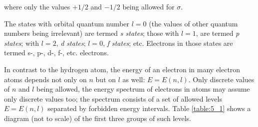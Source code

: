 \noindent
where only the values $+1/2$ and $-1/2$ being allowed for $\sigma$.

The states with orbital quantum number $l=0$ (the values of
other quantum numbers being irrelevant) are termed \textit{s states}; those with $l=1$, are termed \textit{p states}; with $l=2$, \textit{d states}; $l=0$, \textit{f states}; etc. Electrons in those states are termed s-, p-, d-, f-, etc. electrons.

In contrast to the hydrogen atom, the energy of an electron in many electron atoms depends not only on $n$ but on $l$ as well: $E=E(n,l)$. Only discrete values of $n$ and $l$ being allowed, the energy spectrum of electrons in atoms may assume only discrete values too; the spectrum consists of a set of allowed levels $E=E(n,l)$ separated by forbidden energy intervals. Table \ref{table:5_1} shows a diagram (not to scale) of the first three groups of such levels.

